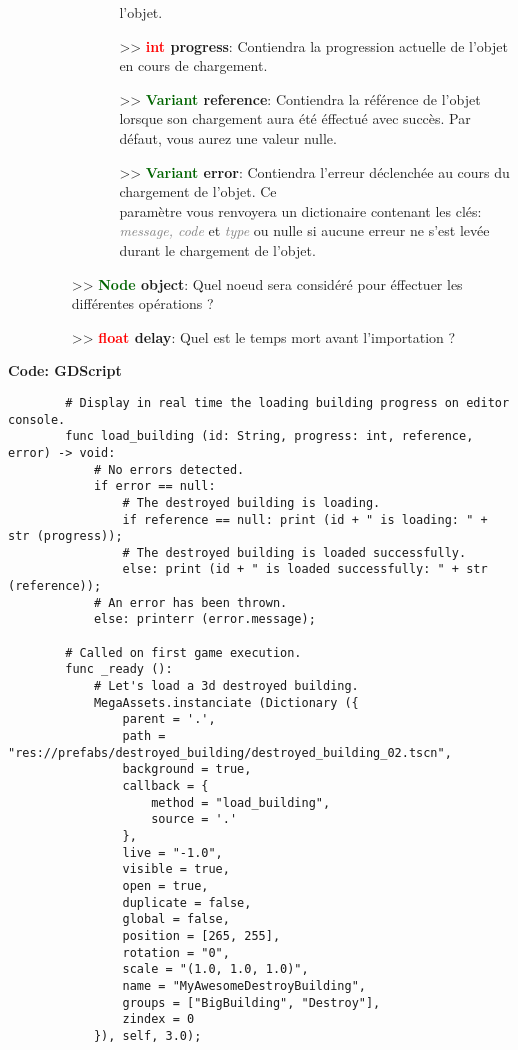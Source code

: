 \documentclass[a4paper, 11pt]{article}
\begin{document}
\begin{description}
\begin{itemize}
\begin{itemize}
\begin{itemize}
					l'objet.
					\item [>> \textbf{\textcolor{red}{int} progress}:] Contiendra la progression actuelle de
					l'objet en cours de chargement.
					\item [>> \textbf{\textcolor{darkgreen}{Variant} reference}:] Contiendra la référence de
					l'objet lorsque son chargement aura été éffectué avec succès. Par défaut, vous aurez une
					valeur nulle.
					\item [>> \textbf{\textcolor{darkgreen}{Variant} error}:] Contiendra l'erreur déclenchée
					au cours du chargement de l'objet. Ce \\paramètre vous renvoyera un dictionaire
					contenant les clés: \textit{\textcolor{gray}{message, code}} et \textit{\textcolor{gray}
					{type}} ou nulle si aucune erreur ne s'est levée durant le chargement de l'objet.
				\end{itemize}
			\end{itemize}
			\item [>> \textbf{\textcolor{darkgreen}{Node} object}:] Quel noeud sera considéré pour éffectuer
			les différentes opérations ?
			\item [>> \textbf{\textcolor{red}{float} delay}:] Quel est le temps mort avant l'importation ?\\
		\end{itemize}
	\end{description}
	\newpage \textbf{Code: GDScript}
	\begin{lstlisting}
		# Display in real time the loading building progress on editor console.
		func load_building (id: String, progress: int, reference, error) -> void:
			# No errors detected.
			if error == null:
				# The destroyed building is loading.
				if reference == null: print (id + " is loading: " + str (progress));
				# The destroyed building is loaded successfully.
				else: print (id + " is loaded successfully: " + str (reference));
			# An error has been thrown.
			else: printerr (error.message);

		# Called on first game execution.
		func _ready ():
			# Let's load a 3d destroyed building.
			MegaAssets.instanciate (Dictionary ({
				parent = '.',
				path = "res://prefabs/destroyed_building/destroyed_building_02.tscn",
				background = true,
				callback = {
					method = "load_building",
					source = '.'
				},
				live = "-1.0",
				visible = true,
				open = true,
				duplicate = false,
				global = false,
				position = [265, 255],
				rotation = "0",
				scale = "(1.0, 1.0, 1.0)",
				name = "MyAwesomeDestroyBuilding",
				groups = ["BigBuilding", "Destroy"],
				zindex = 0
			}), self, 3.0);
	\end{lstlisting}
\end{document}
